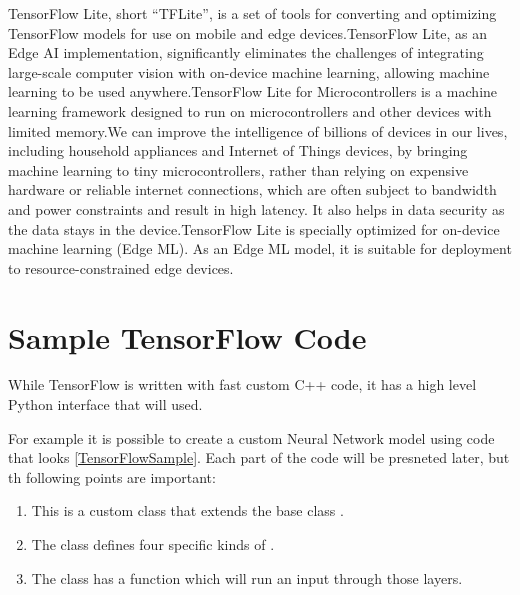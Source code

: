 TensorFlow Lite, short ``TFLite'', is a set of tools for converting and optimizing TensorFlow models for use on mobile and edge devices.TensorFlow Lite, as an Edge AI implementation, significantly eliminates the challenges of integrating large-scale computer vision with on-device machine learning, allowing machine learning to be used anywhere.TensorFlow Lite for Microcontrollers is a machine learning framework designed to run on microcontrollers and other devices with limited memory.We can improve the intelligence of billions of devices in our lives, including household appliances and Internet of Things devices, by bringing machine learning to tiny microcontrollers, rather than relying on expensive hardware or reliable internet connections, which are often subject to bandwidth and power constraints and result in high latency. It also helps in data security as the data stays in the device.TensorFlow Lite is specially optimized for on-device machine learning (Edge ML). As an Edge ML model, it is suitable for deployment to resource-constrained edge devices. \cite{GoogleTensorFlowLite:2021,Dokic:2020}



\section{Sample TensorFlow Code}

While TensorFlow is written with fast custom C++ code, it has a high level Python interface that will used. 

For example it is possible to create a custom Neural Network model using code that looks \ref{TensorFlowSample}. Each part of the code will be presneted later, but th following points are important:


\begin{enumerate}
    \item This is a custom class that extends the  base class .
    \item The class defines four specific kinds of .
    \item The class has a  function which will run an input through those layers.
\end{enumerate}


